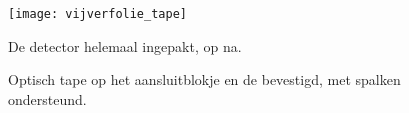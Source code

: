 \begin{figure}
    \centering
    \texttt{[image: vijverfolie\_tape]}
    \label{fig:vijverfolie_tape}
    \caption{De detector helemaal ingepakt, op \pmt na.}
\end{figure}

\begin{figure}
    \centering
    \caption{Optisch tape op het aansluitblokje en de \pmt bevestigd,
             met spalken ondersteund.}
\end{figure}




